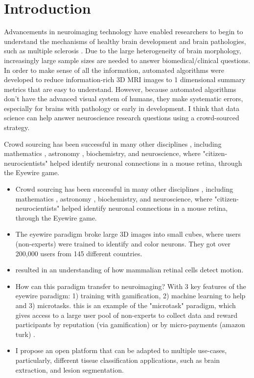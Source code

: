 \section{Introduction}

Advancements in neuroimaging technology have enabled researchers to begin to understand the mechanisms of healthy brain development \cite{giedd1999brain} and brain pathologies, such as multiple sclerosis \cite{bakshi2008mri}. Due to the large heterogeneity of brain morphology, increasingly large sample sizes are needed to answer biomedical/clinical questions. In order to make sense of all the information, automated algorithms were developed to reduce information-rich 3D MRI images to 1 dimensional summary metrics that are easy to understand. However, because automated algorithms don't have the advanced visual system of humans, they make systematic errors, especially for brains with pathology or early in development. I think that data science can help answer neuroscience research questions using a crowd-sourced strategy.

Crowd sourcing has been successful in many other disciplines \cite{wiggins2011conservation}, including mathematics \cite{cranshaw2011polymath}, astronomy \cite{lintott2008galaxy}, biochemistry\cite{eiben2012increased}, and neuroscience\cite{kim2014space}, where "citizen-neurocientists" helped identify neuronal connections in a mouse retina, through the Eyewire game. 

\begin{itemize}
\item Crowd sourcing has been successful in many other disciplines \cite{wiggins2011conservation}, including mathematics \cite{cranshaw2011polymath}, astronomy \cite{lintott2008galaxy}, biochemistry\cite{eiben2012increased}, and neuroscience\cite{kim2014space}, where "citizen-neurocientists" helped identify neuronal connections in a mouse retina, through the Eyewire game. 
\item The eyewire paradigm broke large 3D images into small cubes, where users (non-experts) were trained to identify and color neurons. They got over 200,000 users from 145 different countries.
\item resulted in an understanding of how mammalian retinal cells detect motion.
\item How can this paradigm transfer to neuroimaging? With 3 key features of the eyewire paradigm: 1) training with gamification, 2) machine learning to help and 3) microtasks. this is an example of the "microtask" paradigm, which gives access to a large user pool of non-experts to collect data and reward participants by reputation (via gamification) or  by micro-payments (amazon turk) \cite{kittur2008crowdsourcing}.
\item I propose an open platform that can be adapted to multiple use-cases, particularly, different tissue classification applications, such as brain extraction, and lesion segmentation. 
\end{itemize}

